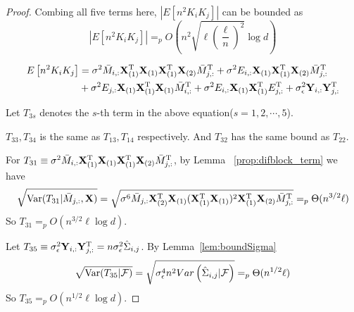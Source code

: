\begin{proof}
Combing all five terms here, $\left|E\left[ n^2 K_i K_j \right]\right|$ can be bounded as
\begin{equation}
    \left|E\left[ n^2 K_i K_j \right]\right| =_p O\left(  n^2 \sqrt{\ell\left(\frac{\ell}{n} \right)^2 } \log d \right)
\end{equation}


\begin{equation}
\begin{split}
    E\left[ n^2 K_i K_j\right] 
    &=  \sigma^2 \bar M_{i, :}\mathbf{X}_{(1)}^{\mathrm{T}}\mathbf{X}_{(1)}\mathbf{X}_{(1)}^{\mathrm{T}}\mathbf{X}_{(2)}\bar M^{\mathrm{T}}_{j, :}   + \sigma^2E_{i,:}\mathbf{X}_{(1)}\mathbf{X}^{\mathrm{T}}_{(1)}\mathbf{X}_{(2)}\bar M^{\mathrm{T}}_{j,:}  \\
    &+ \sigma^2E_{j,:}\mathbf{X}_{(1)}\mathbf{X}^{\mathrm{T}}_{(1)}\mathbf{X}_{(1)}\bar M^{\mathrm{T}}_{i,:}
    +\sigma^2 E_{i,:}\mathbf{X}_{(1)} \mathbf{X}_{(1)}^{\mathrm{T}} E^{\mathrm{T}}_{j,:} + \sigma^2_{\epsilon}\mathbf{Y}_{i,:}\mathbf{Y}^{\mathrm{T}}_{j,:}
\end{split}
\end{equation}

Let $T_{3s}$ denotes the $s$-th term in the above equation($s = 1,2,\cdots, 5$).

$T_{33},T_{34}$ is the same as $T_{13}, T_{14}$ respectively. And $T_{32}$ has the same bound as $T_{22}$. 

For $T_{31} \equiv \sigma^2 \bar M_{i, :}\mathbf{X}_{(1)}^{\mathrm{T}}\mathbf{X}_{(1)}\mathbf{X}_{(1)}^{\mathrm{T}}\mathbf{X}_{(2)}\bar M^{\mathrm{T}}_{j, :}$, by Lemma ~\ref{prop:difblock_term} we have
\begin{equation}
\begin{split}
     \sqrt{\mathrm{Var}(T_{31}|\bar M_{j,:},\mathbf{X})}  
    =\sqrt{\sigma^6 \bar M_{j, :}\mathbf{X}^{\mathrm{T}}_{(2)}\mathbf{X}_{(1)}(\mathbf{X}_{(1)}^{\mathrm{T}}\mathbf{X}_{(1)})^2\mathbf{X}^{\mathrm{T}}_{(1)}\mathbf{X}_{(2)}\bar M^{\mathrm{T}}_{j, :}}    
    =_p \Theta(n^{3/2}\ell)
\end{split}
\end{equation}
So $T_{31} =_p O( n^{3/2} \ell \log d) $.

Let $T_{35} \equiv \sigma^2_{\epsilon}\mathbf{Y}_{i,:}\mathbf{Y}^{\mathrm{T}}_{j,:} = n\sigma^2_{\epsilon}\hat{\Sigma}_{i,j}$. By Lemma~\ref{lem:boundSigma}
\begin{equation}
\begin{split}
     \sqrt{\mathrm{Var}(T_{35}|\mathcal{F})}
    = \sqrt{ \sigma^4_{\epsilon} n^2 Var\left(\hat{\Sigma}_{i,j}|\mathcal{F} \right)}   
    =_p \Theta(n^{1/2}\ell)
\end{split}
\end{equation}
So $T_{35} =_p O( n^{1/2} \ell \log d) $.


\end{proof}
